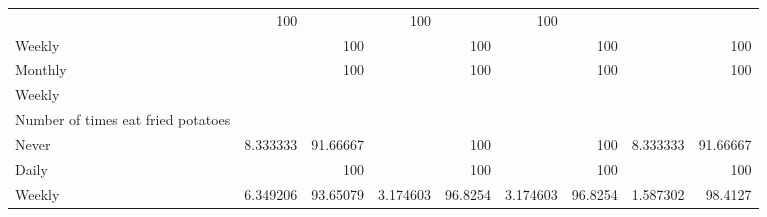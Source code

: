 \documentclass{article}
\begin{document}
\begin{tabular}{lllllllll}
  \multicolumn{1}{r}{} &
  \multicolumn{1}{r}{100} &
  \multicolumn{1}{r}{} &
  \multicolumn{1}{r}{100} &
  \multicolumn{1}{r}{} &
  \multicolumn{1}{r}{100} \\
\multicolumn{1}{l}{\hspace{7em}Weekly} &
  \multicolumn{1}{|r}{} &
  \multicolumn{1}{r}{100} &
  \multicolumn{1}{r}{} &
  \multicolumn{1}{r}{100} &
  \multicolumn{1}{r}{} &
  \multicolumn{1}{r}{100} &
  \multicolumn{1}{r}{} &
  \multicolumn{1}{r}{100} \\
\multicolumn{1}{l}{\hspace{7em}Monthly} &
  \multicolumn{1}{|r}{} &
  \multicolumn{1}{r}{100} &
  \multicolumn{1}{r}{} &
  \multicolumn{1}{r}{100} &
  \multicolumn{1}{r}{} &
  \multicolumn{1}{r}{100} &
  \multicolumn{1}{r}{} &
  \multicolumn{1}{r}{100} \\
\multicolumn{1}{l}{\hspace{5em}Weekly} &
  \multicolumn{1}{|r}{} &
  \multicolumn{1}{r}{} &
  \multicolumn{1}{r}{} &
  \multicolumn{1}{r}{} &
  \multicolumn{1}{r}{} &
  \multicolumn{1}{r}{} &
  \multicolumn{1}{r}{} &
  \multicolumn{1}{r}{} \\
\multicolumn{1}{l}{\hspace{6em}Number of times eat fried potatoes} &
  \multicolumn{1}{|r}{} &
  \multicolumn{1}{r}{} &
  \multicolumn{1}{r}{} &
  \multicolumn{1}{r}{} &
  \multicolumn{1}{r}{} &
  \multicolumn{1}{r}{} &
  \multicolumn{1}{r}{} &
  \multicolumn{1}{r}{} \\
\multicolumn{1}{l}{\hspace{7em}Never} &
  \multicolumn{1}{|r}{8.333333} &
  \multicolumn{1}{r}{91.66667} &
  \multicolumn{1}{r}{} &
  \multicolumn{1}{r}{100} &
  \multicolumn{1}{r}{} &
  \multicolumn{1}{r}{100} &
  \multicolumn{1}{r}{8.333333} &
  \multicolumn{1}{r}{91.66667} \\
\multicolumn{1}{l}{\hspace{7em}Daily} &
  \multicolumn{1}{|r}{} &
  \multicolumn{1}{r}{100} &
  \multicolumn{1}{r}{} &
  \multicolumn{1}{r}{100} &
  \multicolumn{1}{r}{} &
  \multicolumn{1}{r}{100} &
  \multicolumn{1}{r}{} &
  \multicolumn{1}{r}{100} \\
\multicolumn{1}{l}{\hspace{7em}Weekly} &
  \multicolumn{1}{|r}{6.349206} &
  \multicolumn{1}{r}{93.65079} &
  \multicolumn{1}{r}{3.174603} &
  \multicolumn{1}{r}{96.8254} &
  \multicolumn{1}{r}{3.174603} &
  \multicolumn{1}{r}{96.8254} &
  \multicolumn{1}{r}{1.587302} &
  \multicolumn{1}{r}{98.4127} \\

\end{tabular}
\end{document}
